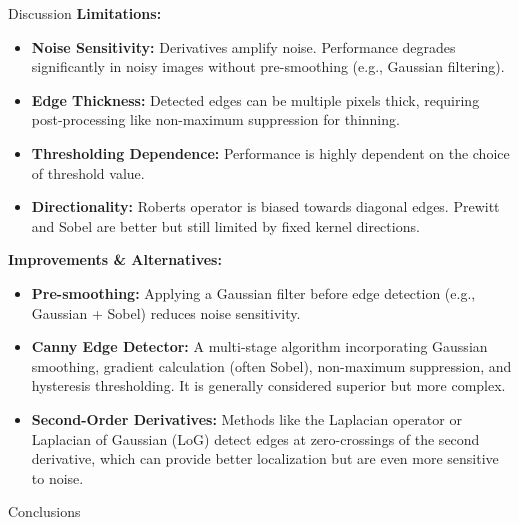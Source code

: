 \documentclass[final]{beamer}
\newlength{\colwidth}
\begin{document}
\begin{frame}[t]
\begin{columns}[t]
\begin{column}{\colwidth}
\begin{block}{Discussion}
    \textbf{Limitations:}
    \begin{itemize}
        \item \textbf{Noise Sensitivity:} Derivatives amplify noise. Performance degrades significantly in noisy images without pre-smoothing (e.g., Gaussian filtering).
        \item \textbf{Edge Thickness:} Detected edges can be multiple pixels thick, requiring post-processing like non-maximum suppression for thinning.
        \item \textbf{Thresholding Dependence:} Performance is highly dependent on the choice of threshold value.
        \item \textbf{Directionality:} Roberts operator is biased towards diagonal edges. Prewitt and Sobel are better but still limited by fixed kernel directions.
    \end{itemize}

    \textbf{Improvements \& Alternatives:} 
    \begin{itemize}
        \item \textbf{Pre-smoothing:} Applying a Gaussian filter before edge detection (e.g., Gaussian + Sobel) reduces noise sensitivity.
        \item \textbf{Canny Edge Detector:} A multi-stage algorithm incorporating Gaussian smoothing, gradient calculation (often Sobel), non-maximum suppression, and hysteresis thresholding. It is generally considered superior but more complex.
        \item \textbf{Second-Order Derivatives:} Methods like the Laplacian operator or Laplacian of Gaussian (LoG) detect edges at zero-crossings of the second derivative, which can provide better localization but are even more sensitive to noise.
    \end{itemize}
  \end{block}

  \begin{block}{Conclusions}
  

\end{block}
\end{column}
\end{columns}
\end{frame}
\end{document}
